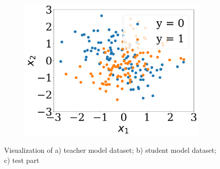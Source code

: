 \documentclass[runningheads]{llncs}
\begin{document}
\begin{figure}[ht]
\begin{subfigure}[h]{0.325\linewidth}
{    \includegraphics[width=\linewidth]{test.pdf}
    \caption{}}
    \end{subfigure}
    
    
    \caption{%
    Visualization of a) teacher model dataset; b) student model dataset; c) test part}
    \label{fig:synth}
\end{figure}
\end{document}
